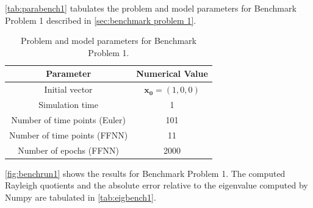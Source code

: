 \autoref{tab:parabench1} tabulates the problem and model parameters for Benchmark Problem 1 described in \autoref{sec:benchmark problem 1}. 

\begin{table}[H]
\caption{Problem and model parameters for Benchmark Problem 1.}
\centering
{}
\begin{tabular}{c|c}
\hline
\hline 
Parameter & Numerical Value
\\
\hline 
\hline 
Initial vector & $\bm{x_0}=(1,0,0)$
\\
Simulation time & 1
\\
Number of time points (Euler) & 101
\\
Number of time points (FFNN) & 11
\\
Number of epochs (FFNN) & 2000
\\
\hline
\hline 
\end{tabular}
\label{tab:parabench1}
\end{table}


\autoref{fig:benchrun1} shows the results for Benchmark Problem 1. The computed Rayleigh quotients and the absolute error relative to the eigenvalue computed by Numpy are tabulated in \autoref{tab:eigbench1}. 

